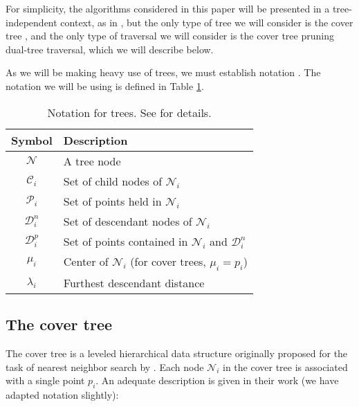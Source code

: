 For simplicity, the algorithms considered in this paper will be presented in a
tree-independent context, as in \citet{curtin2013tree}, but the only type of
tree we will consider is the cover tree \citep{langford2006}, and the only type
of traversal we will consider is the cover tree pruning dual-tree traversal,
which we will describe below.

As we will be making heavy use of trees, we must establish notation \citep[taken
from][]{curtin2013tree}.  The notation we will be using is defined in Table
\ref{tab:notation}.

\begin{table}
{\small
\begin{center}
\begin{tabular}{|c|l|}
\hline
{\bf Symbol} & {\bf Description} \\ \hline
$\mathscr{N}$ & A tree node \\ \hline
$\mathscr{C}_i$ & Set of child nodes of $\mathscr{N}_i$ \\ \hline
$\mathscr{P}_i$ & Set of points held in $\mathscr{N}_i$ \\ \hline
$\mathscr{D}_i^n$ & Set of descendant nodes of $\mathscr{N}_i$ \\ \hline
$\mathscr{D}_i^p$ & Set of points contained in $\mathscr{N}_i$ and
$\mathscr{D}_i^n$ \\ \hline
$\mu_i$ & Center of $\mathscr{N}_i$ (for cover trees, $\mu_i = p_i$) \\ \hline
$\lambda_i$ & Furthest descendant distance \\ \hline
\end{tabular}
\end{center}
}
\caption{Notation for trees.  See \cite{curtin2013tree} for details.}
\label{tab:notation}
\end{table}

\subsection{The cover tree}

The cover tree is a leveled hierarchical data structure originally proposed for
the task of nearest neighbor search by \citet{langford2006}.  Each node
$\mathscr{N}_i$ in the cover tree is associated with a single point $p_i$.  An
adequate description is given in their work (we have adapted notation slightly):

